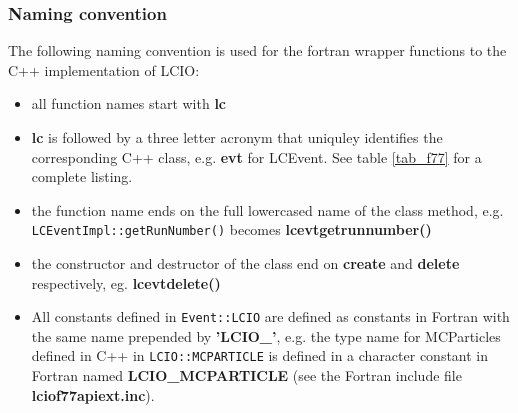\subsubsection{Naming convention}
The following naming convention is used for the fortran wrapper functions to the 
C++ implementation of LCIO:
\begin{itemize}

\item{all function names start with {\bf lc}}

\item{{\bf lc} is followed by a three letter acronym that uniquley identifies the 
corresponding C++ class, e.g. {\bf evt} for LCEvent.} See table \ref{tab_f77} for a complete 
listing.

\item{the function name ends on the full lowercased name of the class method, e.g. \\
 \verb$LCEventImpl::getRunNumber()$ becomes  {\bf lcevtgetrunnumber() } }

\item{the constructor and destructor of the class  end on {\bf create} and {\bf delete} 
respectively, eg. {\bf lcevtdelete()} }

\item{All constants defined in \verb$Event::LCIO$ are defined as constants in Fortran with the 
same name prepended by {\bf 'LCIO\_'}, e.g. the type name for MCParticles defined in C++ in
\verb$LCIO::MCPARTICLE$ is defined in a character constant in Fortran named
{\bf LCIO\_MCPARTICLE} (see the Fortran include file {\bf lciof77apiext.inc}).}

\end{itemize}


